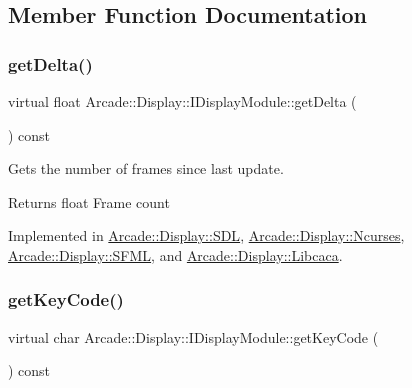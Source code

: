 \subsection{Member Function Documentation}
\mbox{\label{classArcade_1_1Display_1_1IDisplayModule_aab078d82e6fdd32682553947c20226ac}} 
\subsubsection{\texorpdfstring{getDelta()}{getDelta()}}
{\footnotesize\ttfamily virtual float Arcade\+::\+Display\+::\+I\+Display\+Module\+::get\+Delta (\begin{DoxyParamCaption}{ }\end{DoxyParamCaption}) const\hspace{0.3cm}{\ttfamily [pure virtual]}}



Gets the number of frames since last update. 

\begin{DoxyReturn}{Returns}
float Frame count 
\end{DoxyReturn}


Implemented in \mbox{\hyperlink{classArcade_1_1Display_1_1SDL_a1ca09d130dea3bec2481eb72a49c0f03}{Arcade\+::\+Display\+::\+S\+DL}}, \mbox{\hyperlink{classArcade_1_1Display_1_1Ncurses_a16855687c9b3545739f2b65f0d72e86a}{Arcade\+::\+Display\+::\+Ncurses}}, \mbox{\hyperlink{classArcade_1_1Display_1_1SFML_ae1466db8c13b08e99ebe5ffab68884c7}{Arcade\+::\+Display\+::\+S\+F\+ML}}, and \mbox{\hyperlink{classArcade_1_1Display_1_1Libcaca_a6aee007c10e66709680d1ec80f2662a4}{Arcade\+::\+Display\+::\+Libcaca}}.

\mbox{\label{classArcade_1_1Display_1_1IDisplayModule_a403f8a0f065dad707a881ef3cee79805}} 
\subsubsection{\texorpdfstring{getKeyCode()}{getKeyCode()}}
{\footnotesize\ttfamily virtual char Arcade\+::\+Display\+::\+I\+Display\+Module\+::get\+Key\+Code (\begin{DoxyParamCaption}{ }\end{DoxyParamCaption}) const\hspace{0.3cm}{\ttfamily [pure virtual]}}



